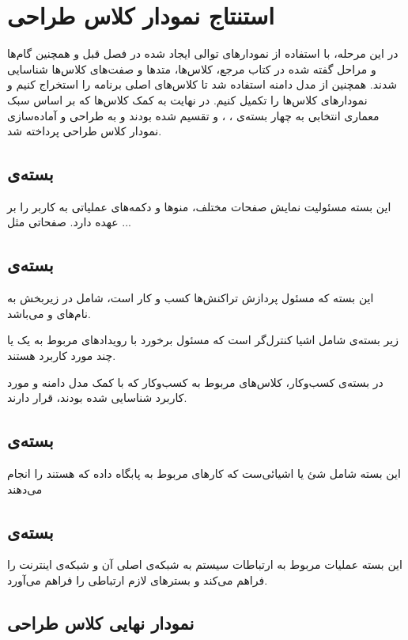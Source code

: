 \chapter{استنتاج نمودار کلاس طراحی}
در این مرحله، با استفاده از نمودار‌های توالی ایجاد شده در فصل قبل و همچنین گام‌ها و مراحل گفته شده در کتاب مرجع، کلاس‌ها، متد‌ها و صفت‌های کلاس‌ها شناسایی شدند. همچنین از مدل دامنه استفاده شد تا کلاس‌های اصلی برنامه را استخراج کنیم و نمودار‌‌های کلاس‌ها را تکمیل کنیم. در نهایت به کمک کلاس‌ها که بر اساس سبک معماری انتخابی به چهار بسته‌ی 
،
،
 و 
تقسیم شده بودند و به طراحی و آماده‌سازی نمودار کلاس طراحی پرداخته شد.

\section{بسته‌ی \frontend}
این بسته مسئولیت نمایش صفحات مختلف، منو‌ها و دکمه‌های عملیاتی به کاربر را بر عهده دارد. صفحاتی مثل ...

\section{بسته‌ی }
این بسته که مسئول پردازش تراکنش‌ها کسب و کار است، شامل در زیربخش به نام‌های   و  می‌باشد.

زیر بسته‌ی  شامل اشیا کنترل‌گر است که مسئول برخورد با رویداد‌های مربوط به یک یا چند مورد کاربرد هستند. 

در بسته‌ی کسب‌وکار،‌ کلاس‌های مربوط به کسب‌وکار که با کمک مدل دامنه و مورد کاربرد شناسایی شده بودند، قرار دارند.
\section{بسته‌ی }
این بسته شامل شئ یا اشیا‌‌ئی‌ست که کار‌های مربوط به پابگاه داده که  هستند را انجام می‌دهند 
\section{بسته‌ی }
این بسته عملیات مربوط به ارتباطات سیستم به شبکه‌ی اصلی آن و شبکه‌ی اینترنت را فراهم می‌کند و بستر‌های لازم ارتباطی را فراهم می‌آورد.
\section{نمودار نهایی کلاس طراحی}
